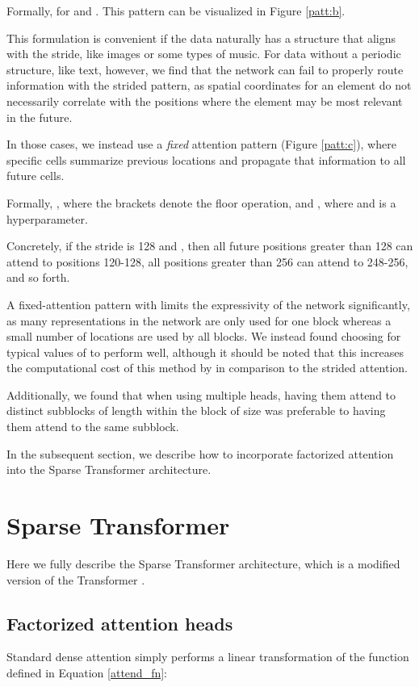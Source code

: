 \documentclass{article}
\begin{document}
Formally,  for  and . This pattern can be visualized in Figure \ref{patt:b}.

This formulation is convenient if the data naturally has a structure that aligns with the stride, like images or some types of music. For data without a periodic structure, like text, however, we find that the network can fail to properly route information with the strided pattern, as spatial coordinates for an element do not necessarily correlate with the positions where the element may be most relevant in the future.

In those cases, we instead use a \textit{fixed} attention pattern (Figure \ref{patt:c}), where specific cells summarize previous locations and propagate that information to all future cells.

Formally, , where the brackets denote the floor operation, and , where  and  is a hyperparameter. 

Concretely, if the stride is 128 and , then all future positions greater than 128 can attend to positions 120-128, all positions greater than 256 can attend to 248-256, and so forth.

A fixed-attention pattern with  limits the expressivity of the network significantly, as many representations in the network are only used for one block whereas a small number of locations are used by all blocks. We instead found choosing  for typical values of  to perform well, although it should be noted that this increases the computational cost of this method by  in comparison to the strided attention.

Additionally, we found that when using multiple heads, having them attend to distinct subblocks of length  within the block of size  was preferable to having them attend to the same subblock.

In the subsequent section, we describe how to incorporate factorized attention into the Sparse Transformer architecture.

\section{Sparse Transformer}
Here we fully describe the Sparse Transformer architecture, which is a modified version of the Transformer \cite{vaswani2017attention}.

\subsection{Factorized attention heads}
Standard dense attention simply performs a linear transformation of the  function defined in Equation \ref{attend_fn}:
\end{document}
